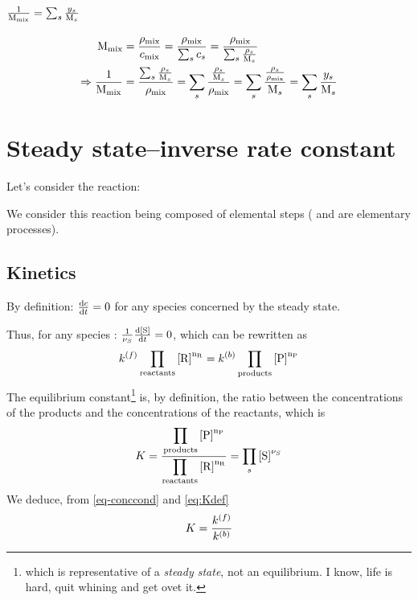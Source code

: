 \section{\texorpdfstring{$\frac{1}{\Mm[\text{mix}]} = \sum_s \frac{\massfrac[s]}{\Mm[s]}$}{Mixture molar mass}}
\label{demo-Mm}
\[
\begin{split}
\Mm[\text{mix}] & = \frac{\mass[\text{mix}]}{\conc_\text{mix}}
                  = \frac{\mass[\text{mix}]}{\sum_s \conc_s}
                  = \frac{\mass[\text{mix}]}{\sum_s \frac{\mass[s]}{\Mm[s]}}\\
\Rightarrow
\frac{1}{\Mm[\text{mix}]}
               & = \frac{\sum_s\frac{\mass[s]}{\Mm[s]}}{\mass[\text{mix}]}
                 = \sum_s\frac{\frac{\mass[s]}{\Mm[s]}}{\mass[\text{mix}]}
                 = \sum_s\frac{\frac{\mass[s]}{\mass[\text{mix}]}}{\Mm[s]}
                 = \sum_s\frac{\massfrac[s]}{\Mm[s]}
\end{split}
\]

\section{Steady state--inverse rate constant}

Let's consider the reaction:
\begin{chemicalEquation}
\label{eq:equat}
\end{chemicalEquation}


We consider this reaction being composed of elemental steps
( and
are elementary processes). 

\subsection{Kinetics}
\label{demo-eq_kin}

By definition: $\frac{\dd \conc}{\dd t} = 0$ for any species concerned by the steady state.

Thus, for any species : 
$\frac{1}{\scoef[S]}\frac{\dd\conc[S]}{\dd t} =  0$, which can be rewritten as
\begin{equation}
\fwdratecons \prodReac = \bkwdratecons \prodProd
\label{eq-conccond}
\end{equation}
The equilibrium constant\footnote{which is representative of a \emph{steady state}, not
an equilibrium. I know, life is hard, quit whining and get ovet it.} is, by definition, the
ratio between the concentrations of the products and the concentrations of the reactants,
which is
\begin{equation}
\Eqconst 
         = \frac{\displaystyle\prodProd}
                {\displaystyle\prodReac}
         = \prod_{s}\conc[S]^{\scoef[S]} 
\label{eq:Kdef}
\end{equation}
We deduce, from \ref{eq-conccond} and \ref{eq:Kdef}
\begin{equation}
\Eqconst = \frac{\fwdratecons}{\bkwdratecons}
\end{equation}

